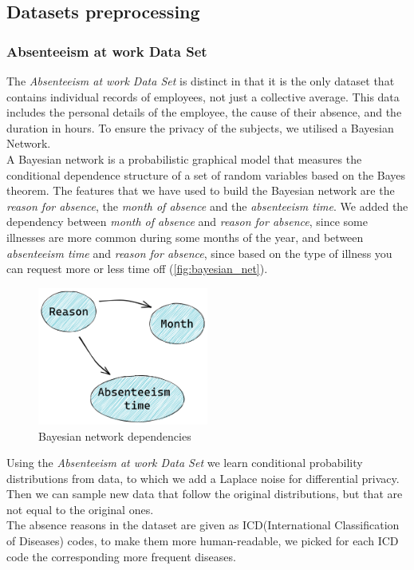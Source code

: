 \subsection{Datasets preprocessing}
\subsubsection*{Absenteeism at work Data Set}
The \textit{Absenteeism at work Data Set} is distinct in that it is the only dataset that contains individual records of employees, not just a collective average. This data includes the personal details of the employee, the cause of their absence, and the duration in hours. To ensure the privacy of the subjects, we utilised a Bayesian Network. \\ 
A Bayesian network is a probabilistic graphical model that measures the conditional dependence structure of a set of random variables based on the Bayes theorem. The features that we have used to build the Bayesian network are the \textit{reason for absence}, the \textit{month of absence} and the \textit{absenteeism time}. We added the dependency between \textit{month of absence} and \textit{reason for absence}, since some illnesses are more common during some months of the year, and between \textit{absenteeism time} and \textit{reason for absence}, since based on the type of illness you can request more or less time off (\autoref{fig:bayesian_net}). \\
\begin{figure}[h] 
    \centering
    \includegraphics[width=0.5\textwidth]{images/bayesian_net.png}
    \caption{Bayesian network dependencies}
    \label{fig:bayesian_net}
  \end{figure}
Using the \textit{Absenteeism at work Data Set} we learn conditional probability distributions from data, to which we add a Laplace noise for differential privacy. Then we can sample new data that follow the original distributions, but that are not equal to the original ones. \\
The absence reasons in the dataset are given as ICD(International Classification of Diseases) codes, to make them more human-readable, we picked for each ICD code the corresponding more frequent diseases.

